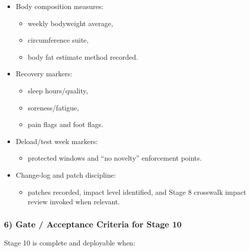 \documentclass[10pt]{article}
\begin{document}
\begin{itemize}
\item Body composition measures:
  \begin{itemize}
  \item weekly bodyweight average,
  \item circumference suite,
  \item body fat estimate method recorded.
  \end{itemize}
\item Recovery markers:
  \begin{itemize}
  \item sleep hours/quality,
  \item soreness/fatigue,
  \item pain flags and foot flags.
  \end{itemize}
\item Deload/test week markers:
  \begin{itemize}
  \item protected windows and “no novelty” enforcement points.
  \end{itemize}
\item Change-log and patch discipline:
  \begin{itemize}
  \item patches recorded, impact level identified, and Stage 8 crosswalk impact review invoked when relevant.
  \end{itemize}
\end{itemize}

\subsubsection*{6) Gate / Acceptance Criteria for Stage 10}

Stage 10 is complete and deployable when:
\end{document}
